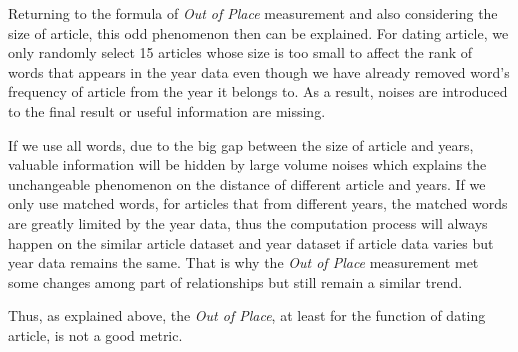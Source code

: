 Returning to the formula of \emph{Out of Place} measurement and also considering the size of article, this odd phenomenon then can be explained. For dating article, we only randomly select 15 articles whose size is too small to affect the rank of words that appears in the year data even though we have already removed word's frequency of article from the year it belongs to. As a result, noises are introduced to the final result or useful information are missing.

If we use all words, due to the big gap between the size of article and years, valuable information will be hidden by large volume noises which explains the unchangeable phenomenon on the distance of different article and years. If we only use matched words, for articles that from different years, the matched words are greatly limited by the year data, thus the computation process will always happen on the similar article dataset and year dataset if article data varies but year data remains the same. That is why the \emph{Out of Place} measurement met some changes among part of relationships but still remain a similar trend.

Thus, as explained above, the \emph{Out of Place}, at least for the function of dating article, is not a good metric.

